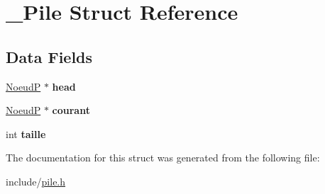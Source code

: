 \hypertarget{struct___pile}{\section{\-\_\-\-Pile Struct Reference}
\label{struct___pile}
}
\subsection*{Data Fields}
\begin{DoxyCompactItemize}
\item 
\hypertarget{struct___pile_a93c0bc948bc58036cb5f6c8d80702cd6}{\hyperlink{struct___noeud_p}{Noeud\-P} $\ast$ {\bfseries head}}\label{struct___pile_a93c0bc948bc58036cb5f6c8d80702cd6}

\item 
\hypertarget{struct___pile_a17093cd76b2f12f37aba4bf9980468cc}{\hyperlink{struct___noeud_p}{Noeud\-P} $\ast$ {\bfseries courant}}\label{struct___pile_a17093cd76b2f12f37aba4bf9980468cc}

\item 
\hypertarget{struct___pile_a29bf3fc0ffe4e72e45f0c84ab4f8cd1e}{int {\bfseries taille}}\label{struct___pile_a29bf3fc0ffe4e72e45f0c84ab4f8cd1e}

\end{DoxyCompactItemize}


The documentation for this struct was generated from the following file\-:\begin{DoxyCompactItemize}
\item 
include/\hyperlink{pile_8h}{pile.\-h}\end{DoxyCompactItemize}

